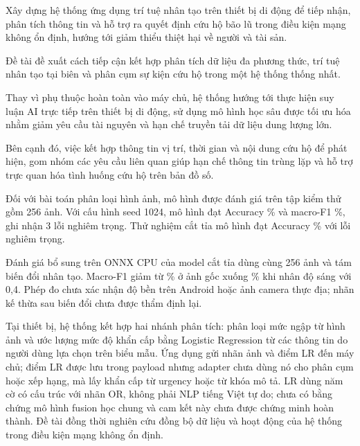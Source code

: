
Xây dựng hệ thống ứng dụng trí tuệ nhân tạo trên thiết bị di động để tiếp nhận, phân tích thông tin và hỗ trợ ra quyết định cứu hộ bão lũ trong điều kiện mạng không ổn định, hướng tới giảm thiểu thiệt hại về người và tài sản.

Đề tài đề xuất cách tiếp cận kết hợp phân tích dữ liệu đa phương thức, trí tuệ nhân tạo tại biên và phân cụm sự kiện cứu hộ trong một hệ thống thống nhất.

Thay vì phụ thuộc hoàn toàn vào máy chủ, hệ thống hướng tới thực hiện suy luận AI trực tiếp trên thiết bị di động, sử dụng mô hình học sâu được tối ưu hóa nhằm giảm yêu cầu tài nguyên và hạn chế truyền tải dữ liệu dung lượng lớn.

Bên cạnh đó, việc kết hợp thông tin vị trí, thời gian và nội dung cứu hộ để phát hiện, gom nhóm các yêu cầu liên quan giúp hạn chế thông tin trùng lặp và hỗ trợ trực quan hóa tình huống cứu hộ trên bản đồ số.

Đối với bài toán phân loại hình ảnh, mô hình được đánh giá trên tập kiểm thử gồm 256 ảnh. Với cấu hình seed 1024, mô hình đạt Accuracy \NewImageAccuracy\% và macro-F1 \NewImageMacroFOne\%, ghi nhận 3 lỗi nghiêm trọng. Thử nghiệm cắt tỉa mô hình đạt Accuracy \PruningAccuracy\% với \PruningCriticalCount{} lỗi nghiêm trọng.

Đánh giá bổ sung trên ONNX CPU của model cắt tỉa dùng cùng 256 ảnh và tám biến đổi nhân tạo. Macro-F1 giảm từ \QualityCleanMacroFOne\% ở ảnh gốc xuống \QualityDarkMacroFOne\% khi nhân độ sáng với 0,4. Phép đo chưa xác nhận độ bền trên Android hoặc ảnh camera thực địa; nhãn kế thừa sau biến đổi chưa được thẩm định lại.

Tại thiết bị, hệ thống kết hợp hai nhánh phân tích: phân loại mức ngập từ hình ảnh và ước lượng mức độ khẩn cấp bằng Logistic Regression từ các thông tin do người dùng lựa chọn trên biểu mẫu. Ứng dụng gửi nhãn ảnh và điểm LR đến máy chủ; điểm LR được lưu trong payload nhưng adapter chưa dùng nó cho phân cụm hoặc xếp hạng, mà lấy khẩn cấp từ urgency hoặc từ khóa mô tả. LR dùng năm cờ có cấu trúc với nhãn OR, không phải NLP tiếng Việt tự do; chưa có bằng chứng mô hình fusion học chung và cam kết này chưa được chứng minh hoàn thành. Đề tài đồng thời nghiên cứu đồng bộ dữ liệu và hoạt động của hệ thống trong điều kiện mạng không ổn định.

